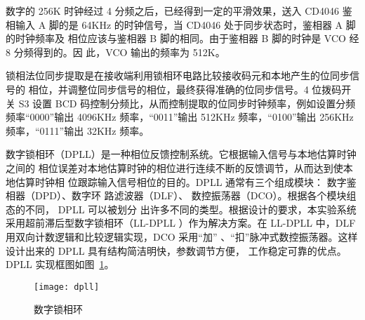 \documentclass[../main]{subfiles}
\begin{document}
数字的 256K 时钟经过 4 分频之后，已经得到一定的平滑效果，送入 CD4046 鉴相输入
A 脚的是 64KHz 的时钟信号，当 CD4046 处于同步状态时，鉴相器 A 脚的时钟频率及
相位应该与鉴相器 B 脚的相同。由于鉴相器 B 脚的时钟是 VCO 经 8 分频得到的。因
此，VCO 输出的频率为 512K。

锁相法位同步提取是在接收端利用锁相环电路比较接收码元和本地产生的位同步信号的
相位，并调整位同步信号的相位，最终获得准确的位同步信号。4 位拨码开关 S3 设置
BCD 码控制分频比，从而控制提取的位同步时钟频率，例如设置分频频率“0000”输出
4096KHz 频率，“0011”输出 512KHz 频率，“0100”输出 256KHz 频率，“0111”输出
32KHz 频率。

数字锁相环（DPLL）是一种相位反馈控制系统。它根据输入信号与本地估算时钟之间的
相位误差对本地估算时钟的相位进行连续不断的反馈调节，从而达到使本地估算时钟相
位跟踪输入信号相位的目的。DPLL 通常有三个组成模块： 数字鉴相器（DPD）、数字环
路滤波器（DLF）、 数控振荡器（DCO）。根据各个模块组态的不同， DPLL 可以被划分
出许多不同的类型。根据设计的要求，本实验系统采用超前滞后型数字锁相环（LL-DPLL
）作为解决方案。在 LL-DPLL 中，DLF 用双向计数逻辑和比较逻辑实现，DCO 采用“加”
、“扣”脉冲式数控振荡器。这样设计出来的 DPLL 具有结构简洁明快，参数调节方便，
工作稳定可靠的优点。DPLL 实现框图如图~\ref{fig:dpll}。

\begin{figure}[htbp]
  \centering
  \texttt{[image: dpll]}
  \caption{数字锁相环}%
  \label{fig:dpll}
\end{figure}

\end{document}
